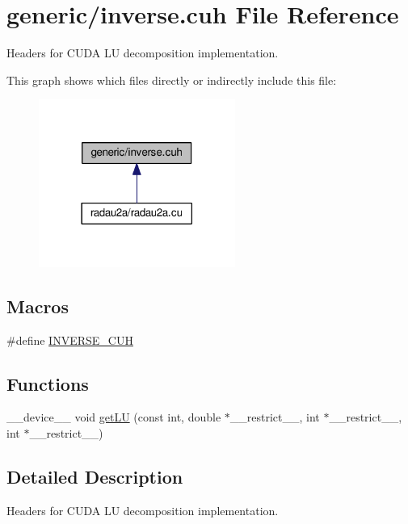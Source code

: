 \hypertarget{inverse_8cuh}{}\section{generic/inverse.cuh File Reference}
\label{inverse_8cuh}


Headers for C\+U\+DA LU decomposition implementation.  


This graph shows which files directly or indirectly include this file\+:\nopagebreak
\begin{figure}[H]
\begin{center}
\leavevmode
\includegraphics[width=182pt]{inverse_8cuh__dep__incl}
\end{center}
\end{figure}
\subsection*{Macros}
\begin{DoxyCompactItemize}
\item 
\#define \hyperlink{inverse_8cuh_aff9b0f54fec8da78d669711592ceca2a}{I\+N\+V\+E\+R\+S\+E\+\_\+\+C\+UH}
\end{DoxyCompactItemize}
\subsection*{Functions}
\begin{DoxyCompactItemize}
\item 
\+\_\+\+\_\+device\+\_\+\+\_\+ void \hyperlink{inverse_8cuh_a138405fdf6512b1bf16282199a8f60cd}{get\+LU} (const int, double $\ast$\+\_\+\+\_\+restrict\+\_\+\+\_\+, int $\ast$\+\_\+\+\_\+restrict\+\_\+\+\_\+, int $\ast$\+\_\+\+\_\+restrict\+\_\+\+\_\+)
\end{DoxyCompactItemize}


\subsection{Detailed Description}
Headers for C\+U\+DA LU decomposition implementation. 



